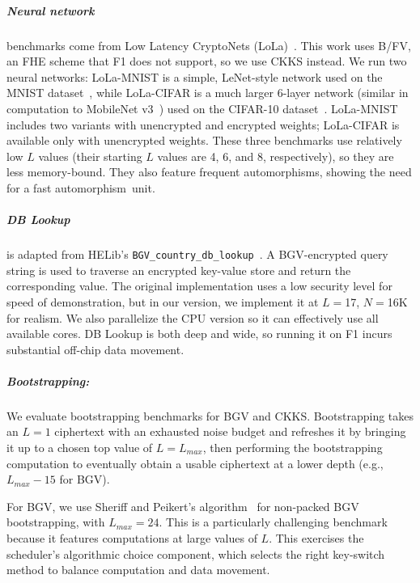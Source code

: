 \subparagraph{Neural network} benchmarks come from Low Latency CryptoNets (LoLa)~\cite{brutzkus:icml19:low}.
This work uses B/FV, an FHE scheme that F1 does not support, so we use CKKS instead.
We run two neural networks:
LoLa-MNIST is a simple, LeNet-style network used on the MNIST dataset~\cite{lecunn:ieee98:gradient-document},
while LoLa-CIFAR is a much larger 6-layer network (similar in computation to MobileNet v3~\cite{howard2019searching})
used on the CIFAR-10 dataset~\cite{cifar10}.
LoLa-MNIST includes two variants with unencrypted and encrypted weights;
LoLa-CIFAR is available only with unencrypted weights.
These three benchmarks use relatively low $L$ values (their starting $L$ values are 4, 6, and 8, respectively),
so they are less memory-bound.
They also feature frequent automorphisms,
showing the need for a fast automorphism~unit.


\tblGF %

\subparagraph{DB Lookup} is adapted from HELib's \texttt{BGV\_country\_db\_lookup}~\cite{helib:db-lookup}. A BGV-encrypted query string is used to traverse an encrypted key-value store and return the corresponding value. The original implementation uses a low security level for speed of demonstration, but in our version, we implement it at $L=$17, $N=$16K for realism. We also parallelize the CPU version so it can effectively use all available cores. DB Lookup is both deep and wide, so running it on F1 incurs substantial off-chip data movement.

\addtocounter{table}{1}
\tblMicrobenchmark

\subparagraph{Bootstrapping:} We evaluate bootstrapping benchmarks for BGV and CKKS.
Bootstrapping takes an $L=1$ ciphertext with an exhausted noise budget and refreshes it
by bringing it up to a chosen top value of $L=L_{max}$, then performing the bootstrapping computation
to eventually obtain a usable ciphertext at a lower depth (e.g., $L_{max} - 15$ for BGV).

For BGV, we use Sheriff and Peikert's algorithm~\cite{alperin:crypto13:practical} for non-packed BGV boot\-strap\-ping, with $L_{max} = 24$.
This is a particularly challenging benchmark because it features computations at large values of $L$.
This exercises the scheduler's 
algorithmic choice component, which selects
the right key-switch method to balance computation and data movement.

